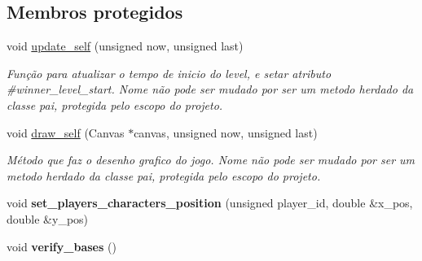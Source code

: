 \subsection*{Membros protegidos}
\begin{DoxyCompactItemize}
\item 
void \mbox{\hyperlink{classMainLevel_a4978a0e152f6a7b55bed0bad74dc7d5a}{update\+\_\+self}} (unsigned now, unsigned last)
\begin{DoxyCompactList}\small\item\em Função para atualizar o tempo de inicio do level, e setar atributo \#winner\+\_\+level\+\_\+start. Nome não pode ser mudado por ser um metodo herdado da classe pai, protegida pelo escopo do projeto. \end{DoxyCompactList}\item 
void \mbox{\hyperlink{classMainLevel_aabad926cf0366de353d716065ab792ad}{draw\+\_\+self}} (Canvas $\ast$canvas, unsigned now, unsigned last)
\begin{DoxyCompactList}\small\item\em Método que faz o desenho grafico do jogo. Nome não pode ser mudado por ser um metodo herdado da classe pai, protegida pelo escopo do projeto. \end{DoxyCompactList}\item 
\mbox{\label{classMainLevel_a8b5a146b3b3186081ca2a0ad49bbad29}} 
void {\bfseries set\+\_\+players\+\_\+characters\+\_\+position} (unsigned player\+\_\+id, double \&x\+\_\+pos, double \&y\+\_\+pos)
\item 
\mbox{\label{classMainLevel_a89ed36254771a662797d0ec50105015f}} 
void {\bfseries verify\+\_\+bases} ()
\end{DoxyCompactItemize}
